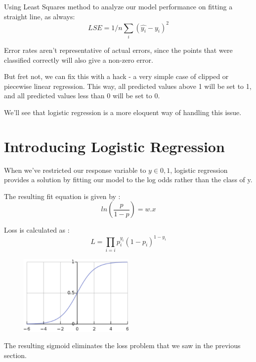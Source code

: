 Using Least Squares method to analyze our model performance on fitting a straight line, as always: 
\begin{equation}
  LSE = 1/n \sum_{i}(\hat{y _{i}} - y _{i})^2
\end{equation}

Error rates aren't representative of actual errors, since the points that were classified correctly will also give a non-zero error.

But fret not, we can fix this with a hack - a very simple case of clipped or piecewise linear regression. This way, all predicted values above 1 will be set to 1, and all predicted values less than 0 will be set to 0.

We'll see that logistic regression is a more eloquent way of handling this issue.

\section{Introducing Logistic Regression}

When we've restricted our response variable to $ y \in {0,1}$, 
logistic regression provides a solution by fitting our model to the log odds rather than the class of y.

The resulting fit equation is given by :
\begin{equation}
  ln(\frac{p}{1-p}) = w.x
\end{equation}

Loss is calculated as : 
\begin{equation}
  L=\prod_{i=i} p_i^{y_i}(1-p_i)^{1-y_i}
\end{equation}

\begin{figure}[ht]
  \begin{center}
    \includegraphics[width=0.5\textwidth]{figures/fig-2.png}
    \caption{}
    \label{fig:example_figure2}
  \end{center}
\end{figure}

The resulting sigmoid eliminates the loss problem that we saw in the previous section. 

